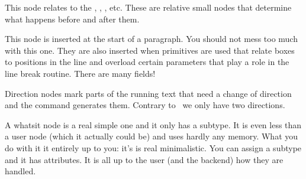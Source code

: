 
\stopsubsection

\startsubsection[title={boundary}]

This node relates to the \type {\noboundary}, \type {\boundary}, \type
{\protrusionboundary}, \type {\wordboundary} etc. These are relative small nodes
that determine what happens before and after them.



\stopsubsection

\startsubsection[title={par}]

This node is inserted at the start of a paragraph. You should not mess too much
with this one. They are also inserted when  primitives are used
that relate boxes to positions in the line and overload certain parameters that
play a role in the line break routine. There are many fields!



\stopsubsection

\startsubsection[title={dir}]

Direction nodes mark parts of the running text that need a change of direction
and the \type {\textdirection} command generates them. Contrary to \LUATEX\
we only have two directions.



\stopsubsection

\startsubsection[title={whatsit}]

A whatsit node is a real simple one and it only has a subtype. It is even less
than a user node (which it actually could be) and uses hardly any memory. What
you do with it it entirely up to you: it's is real minimalistic. You can assign a
subtype and it has attributes. It is all up to the user (and the backend) how
they are handled.



\stopsubsection


\startsubsection[title={attributelist}]

